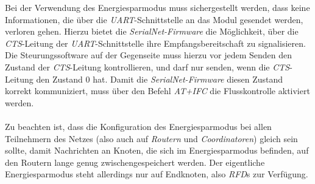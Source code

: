         Bei der Verwendung des Energiesparmodus muss sichergestellt werden, dass keine Informationen,
        die über die \emph{UART}-Schnittstelle an das Modul gesendet werden, verloren gehen. Hierzu 
        bietet die \emph{SerialNet-Firmware} die Möglichkeit, über die \emph{CTS}-Leitung der 
        \emph{UART}-Schnittstelle ihre Empfangsbereitschaft zu signalisieren. Die Steurungssoftware
        auf der Gegenseite muss hierzu vor jedem Senden den Zustand der \emph{CTS}-Leitung
        kontrollieren, und darf nur senden, wenn die \emph{CTS}-Leitung den Zustand 0 hat. Damit die
        \emph{SerialNet-Firmware} diesen Zustand korrekt kommuniziert, muss über den Befehl \emph{AT+IFC}
        die Flusskontrolle aktiviert werden. \\
        \\
        Zu beachten ist, dass die Konfiguration des Energiesparmodus bei allen Teilnehmern des Netzes
        (also auch auf \emph{Routern} und \emph{Coordinatoren}) gleich sein sollte, damit Nachrichten
        an Knoten, die sich im Energiesparmodus befinden, auf den Routern lange genug zwischengespeichert werden.
        Der eigentliche Energiesparmodus steht allerdings nur auf Endknoten, also \emph{RFD}s zur Verfügung.
